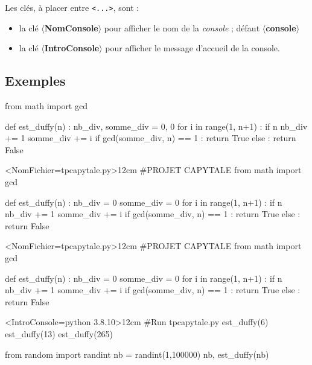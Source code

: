 \documentclass[french,a4paper,10pt]{article}
\begin{document}
\medskip

Les clés, à placer entre \texttt{<...>}, sont :

\begin{itemize}
	\item la clé \textbf{\textsf{$\langle$NomConsole$\rangle$}} pour afficher le nom de la \textit{console} ; \hfill{}défaut \textbf{\textsf{$\langle$console$\rangle$}}
	\item la clé \textbf{\textsf{$\langle$IntroConsole$\rangle$}} pour afficher le message d'accueil de la console.
\end{itemize}

\subsection{Exemples}

{\small\begin{codehigh}
\begin{python}
from math import gcd

def est_duffy(n) :
    nb_div, somme_div = 0, 0
    for i in range(1, n+1) :
        if n %
            nb_div += 1
            somme_div += i
    if gcd(somme_div, n) == 1 :
        return True
    else :
        return False

\end{python}
\end{codehigh}}

{\small\begin{codehigh}
\begin{PitonThonnyEditor}<NomFichier=tpcapytale.py>{12cm}
#PROJET CAPYTALE
from math import gcd

def est_duffy(n) :
    nb_div = 0
    somme_div = 0
    for i in range(1, n+1) :
        if n %
            nb_div += 1
            somme_div += i
    if gcd(somme_div, n) == 1 :
        return True
    else :
        return False
\end{PitonThonnyEditor}
\end{codehigh}}

\begin{PitonThonnyEditor}<NomFichier=tpcapytale.py>{12cm}
#PROJET CAPYTALE
from math import gcd

def est_duffy(n) :
	nb_div = 0
	somme_div = 0
	for i in range(1, n+1) :
		if n %
			nb_div += 1
			somme_div += i
	if gcd(somme_div, n) == 1 :
		return True
	else :
		return False
\end{PitonThonnyEditor}

{\small\begin{codehigh}
\begin{PitonThonnyConsole}<IntroConsole={python 3.8.10}>{12cm}
#Run tpcapytale.py
est_duffy(6)
est_duffy(13)
est_duffy(265)

from random import randint
nb = randint(1,100000)
nb, est_duffy(nb)
\end{PitonThonnyConsole}
\end{codehigh}}
\end{document}
